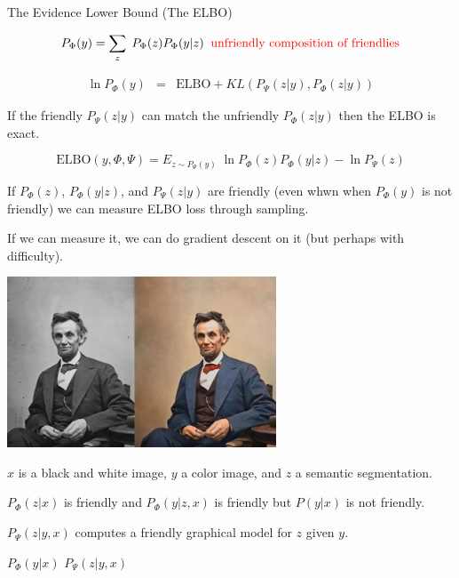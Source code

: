 {
{The Evidence Lower Bound (The ELBO)}

$$P_\Phi(y) = \sum_z\;P_\Phi(z)P_\Phi(y|z)\;\;\mbox{\color{red} unfriendly composition of friendlies}$$

\begin{eqnarray*}
\ln P_\Phi(y) & = & \mathrm{ELBO} + KL(P_\Psi(z|y),P_\Phi(z|y))
\end{eqnarray*}


\vfill
{\color{red} If the friendly $P_\Psi(z|y)$ can match the unfriendly $P_\Phi(z|y)$ then the ELBO is exact.}


\vfill
{\color{red} $$\mathrm{ELBO}(y,\Phi,\Psi)  = E_{z\sim P_\Psi(y)} \; \ln P_\Phi(z)P_\Phi(y|z) - \ln P_\Psi(z)$$}

\vfill
If $P_\Phi(z)$, $P_\Phi(y|z)$, and $P_\Psi(z|y)$ are friendly (even whwn when $P_\Phi(y)$ is not friendly) we can
measure ELBO loss through sampling.

\vfill
If we can measure it, we can do gradient descent on it (but perhaps with difficulty).


\centerline{\includegraphics[height = 2in]{../images/Colorization}}

$x$ is a black and white image, $y$ a color image, and $z$ a semantic segmentation.

\vfill
$P_\Phi(z|x)$ is friendly and $P_\Phi(y|z,x)$ is friendly but $P(y|x)$ is not friendly.

\vfill
$P_\Psi(z|y,x)$ computes a friendly graphical model for $z$ given $y$.

\centerline{$P_\Phi(y|x)$ \hspace{10em} $P_\Psi(z|y,x)$}

}
